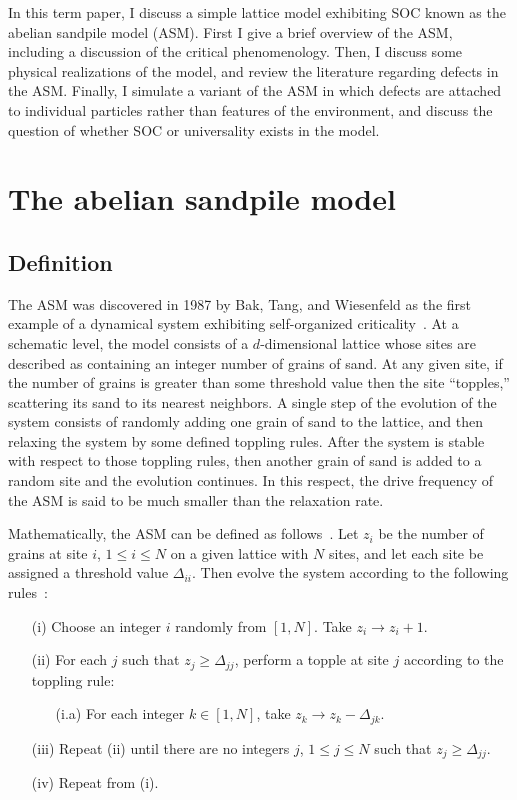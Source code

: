 \documentclass[aps,prb,reprint,superscriptaddress]{revtex4-2}
\begin{document}
In this term paper, I discuss a simple lattice model exhibiting SOC known as the abelian sandpile model (ASM). First I give a brief overview of the ASM, including a discussion of the critical phenomenology. Then, I discuss some physical realizations of the model, and review the literature regarding defects in the ASM. Finally, I simulate a variant of the ASM in which defects are attached to individual particles rather than features of the environment, and discuss the question of whether SOC or universality exists in the model.

\section{The abelian sandpile model}

\subsection{Definition\label{sec:rules}}

The ASM was discovered in 1987 by Bak, Tang, and Wiesenfeld as the first example of a dynamical system exhibiting self-organized criticality~\cite{bak_self-organized_1987}. At a schematic level, the model consists of a $d$-dimensional lattice whose sites are described as containing an integer number of grains of sand. At any given site, if the number of grains is greater than some threshold value then the site ``topples,'' scattering its sand to its nearest neighbors. A single step of the evolution of the system consists of randomly adding one grain of sand to the lattice, and then relaxing the system by some defined toppling rules. After the system is stable with respect to those toppling rules, then another grain of sand is added to a random site and the evolution continues. In this respect, the drive frequency of the ASM is said to be much smaller than the relaxation rate.

Mathematically, the ASM can be defined as follows~\cite{majumdar_equivalence_1992, bak_self-organized_1987, dhar_self-organized_1990}. Let $z_i$ be the number of grains at site $i$, $1 \leq i \leq N$ on a given lattice with $N$ sites, and let each site be assigned a threshold value $\Delta_{ii}$. Then evolve the system according to the following rules~\cite{dhar_self-organized_1990}:

\begin{enumerate}
\item[(i)] Choose an integer $i$ randomly from $[1, N]$. Take $z_i \rightarrow z_i+1$.
\item[(ii)] For each $j$ such that $z_j \geq \Delta_{jj}$, perform a topple at site $j$ according to the toppling rule:
\begin{enumerate}
\item[(i.a)] For each integer $k \in [1, N]$, take $z_k \rightarrow z_k - \Delta_{jk}$.
\end{enumerate}
\item[(iii)] Repeat (ii) until there are no integers $j$, $1 \leq j \leq N$ such that $z_j \geq \Delta_{jj}$.
\item[(iv)] Repeat from (i).
\end{enumerate}
\end{document}
